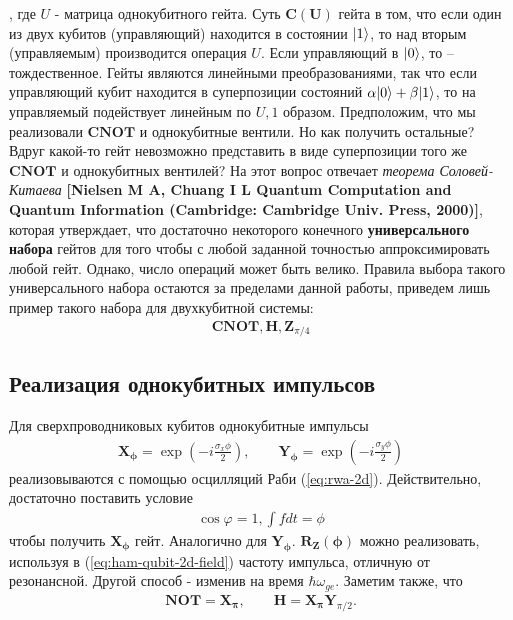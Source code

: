 \documentclass[12pt, twoside]{report}
\DeclarePairedDelimiter\ket{\lvert}{\rangle}
\numberwithin{equation}{section}
\numberwithin{figure}{section}
\begin{document}
, где $U$ - матрица однокубитного гейта. Суть $\mathbf{C(U)}$ гейта в том, что если один из двух кубитов (управляющий) находится в состоянии $\ket{1}$, то над вторым (управляемым) производится операция $U$. Если управляющий в $\ket{0}$, то -- тождественное. Гейты являются линейными преобразованиями, так что если управляющий кубит находится в суперпозиции состояний $\alpha \ket{0} + \beta \ket{1}$, то на управляемый подействует линейным по $U, \mathcal{1}$ образом.
\newline
Предположим, что мы реализовали $\mathbf{CNOT}$ и однокубитные вентили. Но как получить остальные? Вдруг какой-то гейт невозможно представить в виде суперпозиции того же $\mathbf{CNOT}$ и однокубитных вентилей? На этот вопрос отвечает \textit{ теорема Соловей-Китаева} \textbf{[Nielsen M A, Chuang I L Quantum Computation and Quantum Information (Cambridge: Cambridge Univ. Press, 2000)]}, которая утверждает, что достаточно некоторого конечного \textbf{универсального набора} гейтов для того чтобы с любой заданной точностью аппроксимировать любой гейт. Однако, число операций может быть велико. Правила выбора такого универсального набора остаются за пределами данной работы, приведем лишь пример такого набора для двухкубитной системы: 
\begin{gather}
\mathbf{CNOT}, \mathbf{H}, \mathbf{Z}_{\pi/4}
\label{eq:universal-set} 
\end{gather}
\subsection{Реализация однокубитных импульсов}
Для сверхпроводниковых кубитов однокубитные импульсы 
\begin{gather}
\mathbf{X_\phi} = 
\exp \left(-i \frac{\sigma_x \phi}{2} \right), \quad \quad
\mathbf{Y_\phi} = 
\exp \left(-i \frac{\sigma_y \phi}{2} \right)
\end{gather}
реализовываются с помощью осцилляций Раби (\ref{eq:rwa-2d}). Действительно, достаточно поставить условие
\begin{gather*}
\cos \varphi = 1, \int f dt = \phi
\end{gather*}
чтобы получить $\mathbf{X_\phi}$ гейт. Аналогично для $\mathbf{Y_\phi}$.
$\mathbf{R_Z(\phi)}$ можно реализовать, используя в (\ref{eq:ham-qubit-2d-field}) частоту импульса, отличную от резонансной. Другой способ -  изменив на время $\hbar \omega_{ge}$. Заметим также, что 
\begin{gather*}
\mathbf{NOT} = \mathbf{X_\pi},\quad \quad \mathbf{H} = \mathbf{X_\pi}\mathbf{Y}_{\pi/2}.
\end{gather*} 
\end{document}
